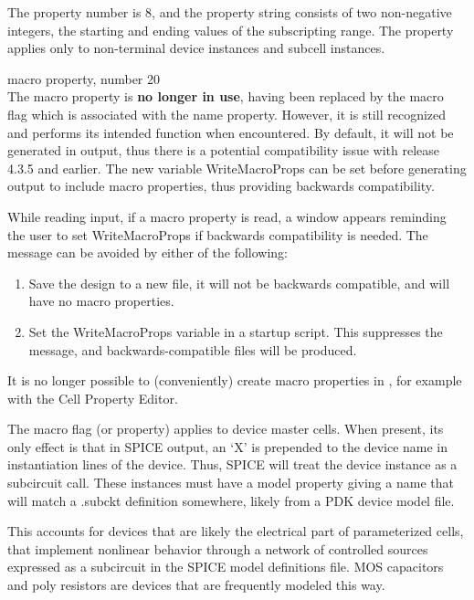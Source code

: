 \begin{description}
The property number is 8, and the property string consists of two
non-negative integers, the starting and ending values of the
subscripting range.  The property applies only to non-terminal device
instances and subcell instances.

\item{\vt macro} property, number 20\\
The {\et macro} property is {\bf no longer in use}, having been
replaced by the {\vt macro} flag which is associated with the {\et
name} property.  However, it is still recognized and performs its
intended function when encountered.  By default, it will not be
generated in output, thus there is a potential compatibility issue
with {\Xic} release 4.3.5 and earlier.  The new variable {\et
WriteMacroProps} can be set before generating output to include {\et
macro} properties, thus providing backwards compatibility.

While reading input, if a {\et macro} property is read, a window
appears reminding the user to set {\et WriteMacroProps} if backwards
compatibility is needed.  The message can be avoided by either of the
following:
\begin{enumerate}
\item{Save the design to a new file, it will not be backwards
compatible, and will have no {\et macro} properties.}

\item{Set the {\et WriteMacroProps} variable in a startup script. 
This suppresses the message, and backwards-compatible files will be
produced.}
\end{enumerate}

It is no longer possible to (conveniently) create {\et macro}
properties in {\Xic}, for example with the {\cb Cell Property Editor}.

The {\vt macro} flag (or property) applies to device master cells. 
When present, its only effect is that in SPICE output, an `{\vt X}' is
prepended to the device name in instantiation lines of the device. 
Thus, SPICE will treat the device instance as a subcircuit call. 
These instances must have a {\et model} property giving a name that
will match a {\vt .subckt} definition somewhere, likely from a PDK
device model file.

This accounts for devices that are likely the electrical part of
parameterized cells, that implement nonlinear behavior through a
network of controlled sources expressed as a subcircuit in the SPICE
model definitions file.  MOS capacitors and poly resistors are devices
that are frequently modeled this way.


\end{description}

